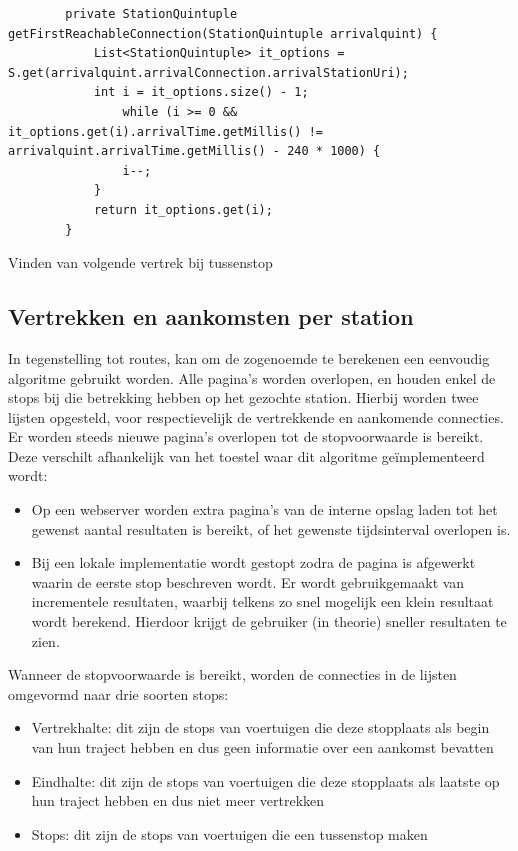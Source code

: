\begin{listing}[h]
	\begin{verbatim}
		private StationQuintuple getFirstReachableConnection(StationQuintuple arrivalquint) {
			List<StationQuintuple> it_options = S.get(arrivalquint.arrivalConnection.arrivalStationUri);
			int i = it_options.size() - 1;
				while (i >= 0 && it_options.get(i).arrivalTime.getMillis() != arrivalquint.arrivalTime.getMillis() - 240 * 1000) {
				i--;
			}
			return it_options.get(i);
		}
	\end{verbatim}
	\caption[CSA: Journey extraction bij tussenstops]{Vinden van volgende vertrek bij tussenstop}
	\label{code:2:csaJourneyExtractionReachable}
\end{listing}

\subsection{Vertrekken en aankomsten per station}
In tegenstelling tot routes, kan om de zogenoemde  te berekenen een eenvoudig algoritme gebruikt worden. Alle pagina's worden overlopen, en houden enkel de stops bij die betrekking hebben op het gezochte station. Hierbij worden twee lijsten opgesteld, voor respectievelijk de vertrekkende en aankomende connecties. Er worden steeds nieuwe pagina's overlopen tot de stopvoorwaarde is bereikt. Deze verschilt afhankelijk van het toestel waar dit algoritme geïmplementeerd wordt:
\begin{itemize}
	\item Op een webserver worden extra pagina's van de interne opslag laden tot het gewenst aantal resultaten is bereikt, of het gewenste tijdsinterval overlopen is.
	\item Bij een lokale implementatie wordt gestopt zodra de pagina is afgewerkt waarin de eerste stop beschreven wordt. Er wordt gebruikgemaakt van incrementele resultaten, waarbij telkens zo snel mogelijk een klein resultaat wordt berekend. Hierdoor krijgt de gebruiker (in theorie) sneller resultaten te zien.
\end{itemize}

Wanneer de stopvoorwaarde is bereikt, worden de connecties in de lijsten omgevormd naar drie soorten stops:
\begin{itemize}
	\item Vertrekhalte:  dit zijn de stops van voertuigen die deze stopplaats als begin van hun traject hebben en dus geen informatie over een aankomst bevatten
	\item Eindhalte: dit zijn de stops van voertuigen die deze stopplaats als laatste op hun traject hebben en dus niet meer vertrekken
	\item Stops: dit zijn de stops van voertuigen die een tussenstop maken
\end{itemize}

